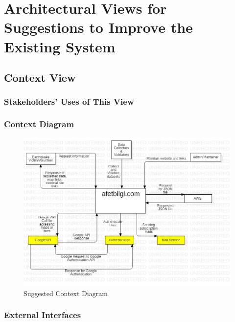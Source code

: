 \section{Architectural Views for Suggestions to Improve the Existing System}

\subsection{Context View}

\subsubsection{Stakeholders' Uses of This View}

\subsubsection{Context Diagram}

\begin{figure}[H]
  \centering
  \includegraphics[width=\linewidth]{img/context-diagram-s5.jpg}
  \caption{Suggested Context Diagram}
\end{figure}

\subsubsection{External Interfaces}

